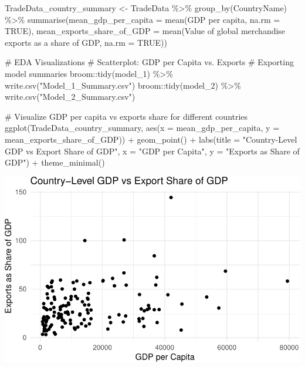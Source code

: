 \documentclass[
  10pt,
]{article}
\newenvironment{Shaded}{\begin{snugshade}}{\end{snugshade}}
\newcommand{\AttributeTok}[1]{\textcolor[rgb]{0.40,0.45,0.13}{#1}}
\newcommand{\CommentTok}[1]{\textcolor[rgb]{0.37,0.37,0.37}{#1}}
\newcommand{\ConstantTok}[1]{\textcolor[rgb]{0.56,0.35,0.01}{#1}}
\newcommand{\FunctionTok}[1]{\textcolor[rgb]{0.28,0.35,0.67}{#1}}
\newcommand{\NormalTok}[1]{\textcolor[rgb]{0.00,0.23,0.31}{#1}}
\newcommand{\OtherTok}[1]{\textcolor[rgb]{0.00,0.23,0.31}{#1}}
\newcommand{\SpecialCharTok}[1]{\textcolor[rgb]{0.37,0.37,0.37}{#1}}
\newcommand{\StringTok}[1]{\textcolor[rgb]{0.13,0.47,0.30}{#1}}
\begin{document}
\begin{Shaded}
\begin{Highlighting}[]
\NormalTok{TradeData\_country\_summary }\OtherTok{\textless{}{-}}\NormalTok{ TradeData }\SpecialCharTok{\%\textgreater{}\%}
  \FunctionTok{group\_by}\NormalTok{(CountryName) }\SpecialCharTok{\%\textgreater{}\%}
  \FunctionTok{summarise}\NormalTok{(}\AttributeTok{mean\_gdp\_per\_capita =} \FunctionTok{mean}\NormalTok{(}\StringTok{\textasciigrave{}}\AttributeTok{GDP per capita}\StringTok{\textasciigrave{}}\NormalTok{, }\AttributeTok{na.rm =} \ConstantTok{TRUE}\NormalTok{),}
            \AttributeTok{mean\_exports\_share\_of\_GDP =} \FunctionTok{mean}\NormalTok{(}\StringTok{\textasciigrave{}}\AttributeTok{Value of global merchandise exports as a share of GDP}\StringTok{\textasciigrave{}}\NormalTok{, }\AttributeTok{na.rm =} \ConstantTok{TRUE}\NormalTok{))}

\CommentTok{\# EDA Visualizations}
\CommentTok{\# Scatterplot: GDP per Capita vs. Exports}
\CommentTok{\# Exporting model summaries}
\NormalTok{broom}\SpecialCharTok{::}\FunctionTok{tidy}\NormalTok{(model\_1) }\SpecialCharTok{\%\textgreater{}\%} \FunctionTok{write.csv}\NormalTok{(}\StringTok{"Model\_1\_Summary.csv"}\NormalTok{)}
\NormalTok{broom}\SpecialCharTok{::}\FunctionTok{tidy}\NormalTok{(model\_2) }\SpecialCharTok{\%\textgreater{}\%} \FunctionTok{write.csv}\NormalTok{(}\StringTok{"Model\_2\_Summary.csv"}\NormalTok{)}


\CommentTok{\# Visualize GDP per capita vs exports share for different countries}
\FunctionTok{ggplot}\NormalTok{(TradeData\_country\_summary, }\FunctionTok{aes}\NormalTok{(}\AttributeTok{x =}\NormalTok{ mean\_gdp\_per\_capita, }\AttributeTok{y =}\NormalTok{ mean\_exports\_share\_of\_GDP)) }\SpecialCharTok{+}
  \FunctionTok{geom\_point}\NormalTok{() }\SpecialCharTok{+}
  \FunctionTok{labs}\NormalTok{(}\AttributeTok{title =} \StringTok{"Country{-}Level GDP vs Export Share of GDP"}\NormalTok{, }
       \AttributeTok{x =} \StringTok{"GDP per Capita"}\NormalTok{, }
       \AttributeTok{y =} \StringTok{"Exports as Share of GDP"}\NormalTok{) }\SpecialCharTok{+}
  \FunctionTok{theme\_minimal}\NormalTok{()}
\end{Highlighting}
\end{Shaded}

\includegraphics{draft_1_files/figure-pdf/unnamed-chunk-21-1.pdf}
\end{document}
